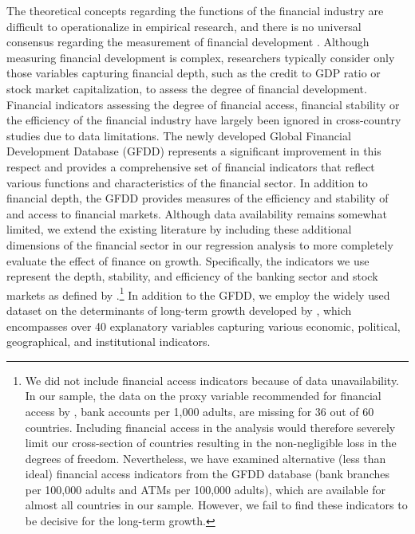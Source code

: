 The theoretical concepts regarding the functions of the financial industry are difficult to operationalize in empirical research, and there is no universal consensus regarding the measurement of financial development \citep{KingLevine1993a}. Although measuring financial development is complex, researchers typically consider only those variables capturing financial depth, such as the credit to GDP ratio or stock market capitalization, to assess the degree of financial development. Financial indicators assessing the degree of financial access, financial stability or the efficiency of the financial industry have largely been ignored in cross-country studies due to data limitations. The newly developed Global Financial Development Database (GFDD) represents a significant improvement in this respect and provides a comprehensive set of financial indicators that reflect various functions and characteristics of the financial sector. In addition to financial depth, the GFDD provides measures of the efficiency and stability of and access to financial markets. Although data availability remains somewhat limited, we extend the existing literature by including these additional dimensions of the financial sector in our regression analysis to more completely evaluate the effect of finance on growth. Specifically, the indicators we use represent the depth, stability, and efficiency of the banking sector and stock markets as defined by \citet{Cihaketal2013}.\footnote{We did not include financial access indicators because of data unavailability. In our sample, the data on the proxy variable recommended for financial access by \citet{Cihaketal2013}, bank accounts per 1,000 adults, are missing for 36 out of 60 countries. Including financial access in the analysis would therefore severely limit our cross-section of countries resulting in the non-negligible loss in the degrees of freedom. Nevertheless, we have examined alternative (less than ideal) financial access indicators from the GFDD database (bank branches per 100,000 adults and ATMs per 100,000 adults), which are available for almost all countries in our sample. However, we fail to find these indicators to be decisive for the long-term growth.} In addition to the GFDD, we employ the widely used dataset on the determinants of long-term growth developed by \citet{Fernandezetal2001}, which encompasses over 40 explanatory variables capturing various economic, political, geographical, and institutional indicators. 

